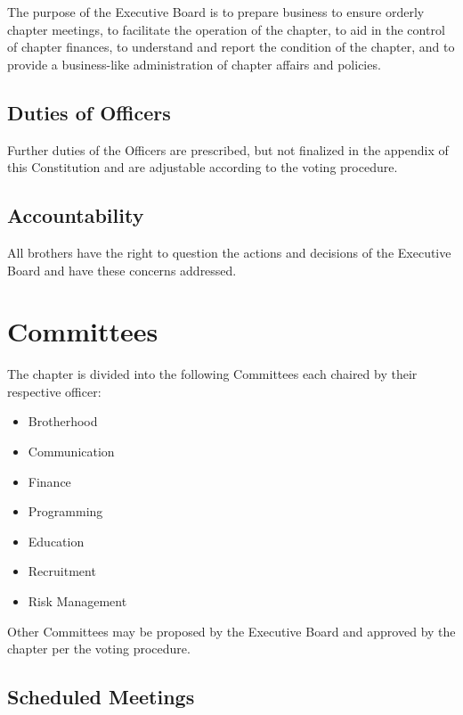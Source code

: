 The purpose of the Executive Board is to prepare business to ensure orderly
chapter meetings, to facilitate the operation of the chapter, to aid in the
control of chapter finances, to understand and report the condition of the
chapter, and to provide a business-like administration of chapter affairs and
policies.

\subsection{Duties of Officers}
\label{sec:duties-of-officers}

Further duties of the Officers are prescribed, but not finalized in the appendix
of this Constitution and are adjustable according to the voting procedure.

\subsection{Accountability}
\label{sec:accountability}

All brothers have the right to question the actions and decisions of the
Executive Board and have these concerns addressed.

\section{Committees}
\label{sec:committees}

The chapter is divided into the following Committees each chaired by their
respective officer: 

\begin{itemize}
	\item Brotherhood
	\item Communication
	\item Finance
	\item Programming
	\item Education
	\item Recruitment
	\item Risk Management
\end{itemize}

Other Committees may be proposed by the Executive Board and approved by the
chapter per the voting procedure.

\subsection{Scheduled Meetings}
\label{sec:committee-scheduled-meetings}

